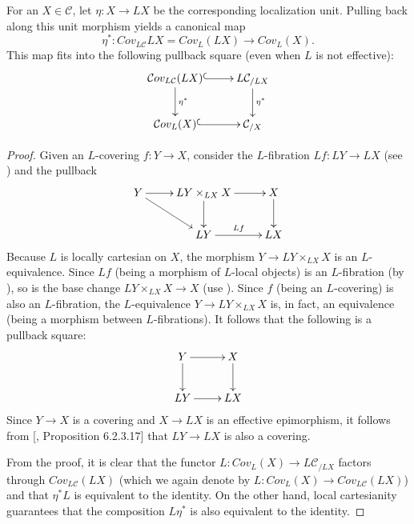 For an $X\in \mathcal{C}$, let $\eta:X\to LX$ be the corresponding localization unit. Pulling back along this unit morphism yields a canonical map $$\eta^*: Cov_{L\mathcal{C}}{LX}=Cov_L(LX)\to Cov_{L}(X).$$ This map fits into the following pullback square (even when $L$ is not effective):
\[
\xymatrix{
\mathcal{C}ov_{L\mathcal{C}}(LX)\ar@{^(->}[r]\ar[d]^{\eta^*}&L\mathcal{C}_{/LX}\ar[d]^{\eta^*}\\
\mathcal{C}ov_{L}(X)\ar@{^(->}[r] &\mathcal{C}_{/X}
}
\]

\begin{proof}
    Given an $L$-covering $f:Y\to X$, consider the $L$-fibration $Lf: LY\to LX$ (see ) and the pullback 
    \[
    \xymatrix{
    Y\ar[r]\ar[dr]& LY\times_{LX}{X}\ar[r]\ar[d]&X\ar[d]\\
   &LY\ar[r]^{Lf}&LX
    }
    \]
Because $L$ is locally cartesian on $X$, the morphism $ Y\to LY\times_{LX}{X}$ is an $L$-equivalence. Since $Lf$ (being a morphism of $L$-local objects) is an $L$-fibration (by ), so is the base change $LY\times_{LX}X\to X$ (use ). Since $f$ (being an $L$-covering) is also an $L$-fibration, the $L$-equivalence $ Y\to LY\times_{LX}{X}$ is, in fact, an equivalence (being a morphism between $L$-fibrations). It follows that the following is a pullback square:
\[
\xymatrix{ Y\ar[r]\ar[d]&X\ar[d]\\
LY\ar[r] &LX}
\]
Since $Y\to X$ is a covering and $X\to LX$ is an effective epimorphism, it follows from [\cite{lurie2009higher}, Proposition 6.2.3.17] that $LY\to LX$ is also a covering. 

From the proof, it is clear that the functor $L:Cov_L(X)\to L\mathcal{C}_{/LX}$ factors through $Cov_{L\mathcal{C}}(LX)$ (which we again denote by $L:Cov_L(X)\to Cov_{L\mathcal{C}}(LX)$) and that $\eta^*L$ is equivalent to the identity. On the other hand, local cartesianity guarantees that the composition $L\eta^*$ is also equivalent to the identity. 
\end{proof}

